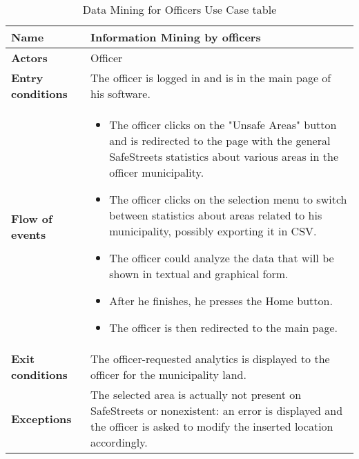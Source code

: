 \begin{table}[!htbp]
	\hypertarget{tab:dataminingofficertab}{}
	\centering
	\begin{tabular}{lp{9cm}}
\bf\large Name&\bf\large Information Mining by officers\\
\hline
\hline
\bf Actors&Officer\\
\hline
\bf Entry conditions&The officer is logged in and is in the main page of his software.\\
\hline
\bf Flow of events&
\begin{itemize}

\item The officer clicks on the "Unsafe Areas" button and is redirected to the page with the general SafeStreets statistics about various areas in the officer municipality.

\item The officer clicks on the selection menu to switch between statistics about areas related to his municipality, possibly exporting it in CSV.

\item The officer could analyze the data that will be shown in textual and graphical form.

\item After he finishes, he presses the Home button.

\item The officer is then redirected to the main page.

\end{itemize}
\\
\hline
\bf Exit conditions&The officer-requested analytics is displayed to the officer for the municipality land.\\
\hline
\bf Exceptions&The selected area is actually not present on SafeStreets or nonexistent: an error is displayed and the officer is asked to modify the inserted location accordingly.
\\
\hline

\end{tabular}
\caption{Data Mining for Officers Use Case table}
 \label{tab:dataminingofficertab}
\end{table}